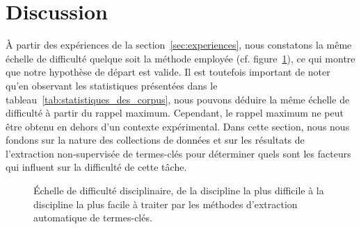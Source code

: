 \section{Discussion}
\label{sec:discussion}
  À partir des expériences de la section~\ref{sec:experiences},
  nous constatons la même échelle de difficulté quelque soit la méthode
  employée (cf. figure~\ref{fig:echelle}), ce qui montre que notre hypothèse de
  départ est valide. Il est toutefois important de noter qu'en observant les
  statistiques présentées dans le tableau~\ref{tab:statistiques_des_corpus},
  nous pouvons déduire la même échelle de difficulté à partir du rappel maximum.
  Cependant, le rappel maximum ne peut être obtenu en dehors d'un contexte
  expérimental. Dans cette section, nous nous fondons sur la nature des
  collections de données et sur les résultats de l'extraction non-supervisée de
  termes-clés pour déterminer quels sont les facteurs qui influent sur la
  difficulté de cette tâche.
  \begin{figure}
    \centering
    \caption{Échelle de difficulté disciplinaire, de la discipline la plus
             difficile à la discipline la plus facile à traiter par les méthodes
             d'extraction automatique de termes-clés.
             \label{fig:echelle}}
  \end{figure}

